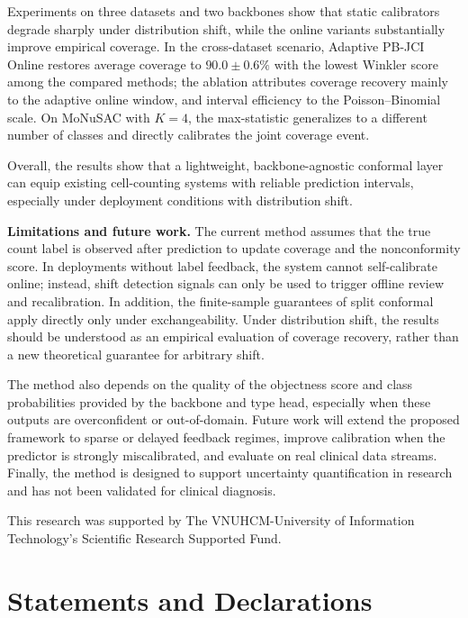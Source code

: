 \documentclass[smallextended,natbib]{svjour3}
\begin{document}
Experiments on three datasets and two backbones show that static calibrators
degrade sharply under distribution shift, while the online variants substantially
improve empirical coverage. In the cross-dataset scenario, Adaptive PB-JCI Online
restores average coverage to \(90.0\pm0.6\%\) with the lowest Winkler score among
the compared methods; the ablation attributes coverage recovery mainly to the
adaptive online window, and interval efficiency to the Poisson--Binomial scale. On
MoNuSAC with \(K=4\), the max-statistic generalizes to a different number of
classes and directly calibrates the joint coverage event.

Overall, the results show that a lightweight, backbone-agnostic conformal layer can
equip existing cell-counting systems with reliable prediction intervals, especially
under deployment conditions with distribution shift.

\textbf{Limitations and future work.}
The current method assumes that the true count label is observed after prediction to
update coverage and the nonconformity score. In deployments without label feedback,
the system cannot self-calibrate online; instead, shift detection signals can only
be used to trigger offline review and recalibration. In addition, the finite-sample
guarantees of split conformal apply directly only under exchangeability. Under
distribution shift, the results should be understood as an empirical evaluation of
coverage recovery, rather than a new theoretical guarantee for arbitrary shift.

The method also depends on the quality of the objectness score and class
probabilities provided by the backbone and type head, especially when these outputs
are overconfident or out-of-domain. Future work will extend the proposed
framework to sparse or delayed feedback regimes, improve calibration when the
predictor is strongly miscalibrated, and evaluate on real clinical data streams.
Finally, the method is designed to support uncertainty quantification in research and
has not been validated for clinical diagnosis.

\begin{acknowledgements}
This research was supported by The VNUHCM-University of Information Technology's
Scientific Research Supported Fund.
\end{acknowledgements}

\section*{Statements and Declarations}
\end{document}
